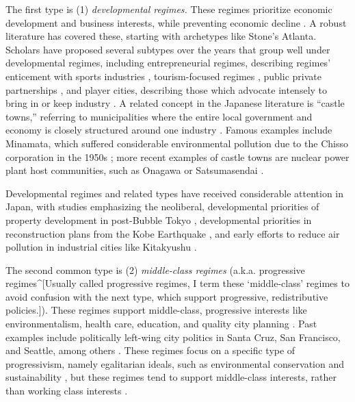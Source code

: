 \documentclass[preprint, 3p,
authoryear]{elsarticle} %
\begin{document}
The first type is (1) \emph{developmental regimes.} These regimes
prioritize economic development and business interests, while preventing
economic decline
\citep{stone_1989, austrian_and_rosentraub_2002, de_socio_2007}. A
robust literature has covered these, starting with archetypes like
Stone's \citeyearpar{stone_1989} Atlanta. Scholars have proposed several
subtypes over the years that group well under developmental regimes,
including entrepreneurial regimes, describing regimes' enticement with
sports industries \citep{euchner_1993}, tourism-focused regimes
\citep{russo_and_scarnato_2018}, public private partnerships
\citep{davies_2017}, and player cities, describing those which advocate
intensely to bring in or keep industry \citep{portz_1990}. A related
concept in the Japanese literature is ``castle towns,'' referring to
municipalities where the entire local government and economy is closely
structured around one industry \citep{hill_and_fujita_1993}. Famous
examples include Minamata, which suffered considerable environmental
pollution due to the Chisso corporation in the 1950s
\citep{funabashi_2006}; more recent examples of castle towns are nuclear
power plant host communities, such as Onagawa or Satsumasendai
\citep{aldrich_and_fraser_2017}.

Developmental regimes and related types have received considerable
attention in Japan, with studies emphasizing the neoliberal,
developmental priorities of property development in post-Bubble Tokyo
\citep{saito_2003, tsukamoto_2012, sorensen_et_al_2010}, developmental
priorities in reconstruction plans from the Kobe Earthquake
\citep{edgington_2010}, and early efforts to reduce air pollution in
industrial cities like Kitakyushu \citep{yeum_2002}.

The second common type is (2) \emph{middle-class regimes} (a.k.a.
progressive regimes\^{}{[}Usually called progressive regimes, I term
these `middle-class' regimes to avoid confusion with the next type,
which support progressive, redistributive policies.{]}). These regimes
support middle-class, progressive interests like environmentalism,
health care, education, and quality city planning
\citep{deleon_1992, gendron_and_domhoff_2018, rosdil_2016}. Past
examples include politically left-wing city politics in Santa Cruz, San
Francisco, and Seattle, among others \citep{gendron_and_domhoff_2018}.
These regimes focus on a specific type of progressivism, namely
egalitarian ideals, such as environmental conservation and
sustainability \citep{rosol_et_al_2017}, but these regimes tend to
support middle-class interests, rather than working class interests
\citep{kilburn_2004}.
\end{document}
